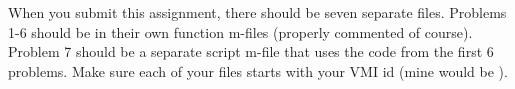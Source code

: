 When you submit this assignment, there should be seven separate files.  Problems 1-6 should be in their own function m-files (properly commented of course).  Problem 7 should be a separate script m-file that uses the code from the first 6 problems.  Make sure each of your files starts with your VMI id (mine would be ).
